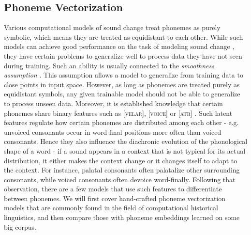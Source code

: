 \documentclass[6pt]{article}
\begin{document}
\subsection{Phoneme Vectorization}
\label{Phoneme Vectorization}
Various computational models of sound change treat phonemes as purely symbolic, which means they are treated as equidistant to each other. While such models can achieve good performance on the task of modeling sound change  \citep{bouchard2007probabilistic,bouchard2013automated}, they have certain problems to generalize well to process data they have not seen during training. Such an ability is usually connected to the \textit{smoothness assumption} \citep[c.f.\ section \ref{Motivation};][p. 555]{Goodfellow-et-al-2016-Book}. This assumption allows a model to generalize from training data to close points in input space.  However, as long as phonemes are treated purely as equidistant symbols, any given trainable model should not be able to generalize to process unseen data.
Moreover, it is established knowledge that certain phonemes share binary features such as \textsc{[velar]}, \textsc{[voice]}  or \textsc{[atr]} \citep{chomsky1968sound}. Such latent features regulate how certain phonemes are distributed among each other - e.g. unvoiced consonants occur in word-final positions more often than voiced consonants. Hence they also influence the diachronic evolution of the phonological shape of a word - if a sound appears in a context that is not typical for its actual distribution, it either makes the context change or it changes itself to adapt to the context. For instance, palatal consonants often palatalize other surrounding consonants, while voiced consonants often devoice word-finally.
Following that observation, there are a few models that use such features to differentiate between phonemes. We will first cover hand-crafted phoneme vectorization models that are commonly found in the field of computational historical linguistics, and then compare those with phoneme embeddings learned on some big corpus.
\end{document}
